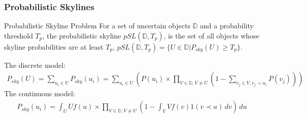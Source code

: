 \documentclass{beamer}
\begin{document}
\begin{frame}
\frametitle{Probabilistic Skylines}
\begin{block}{Probabilistic Skyline Problem}
For a set of uncertain objects $\mathbb{D}$ and a probability threshold $T_p$, the probabilistic skyline $pSL(\mathbb{D}, T_p)$, is the set of all objects whose skyline probabilities are at least $T_p$, $pSL(\mathbb{D}, T_p) = \{U \in \mathbb{D} | P_{sky}(U) \geq T_p\}$.
\end{block}
The discrete model:
\begin{align*}
P_{sky}(U) = \sum\limits_{u_i\in U} P_{sky}(u_i)= \sum\limits_{u_i\in U} (P(u_i)\times\prod\limits_{V\in\mathbb{D},V\neq U}(1-\sum\limits_{v_j\in V,v_j\prec u_i}P(v_j)))
\end{align*}
The continuous model:
\begin{align*}
P_{sky}(u_i) = \int_{U}Uf(u)\times\prod\limits_{V\in\mathbb{D},V\neq U}(1-\int_{V}Vf(v)1(v\prec u)\,dv)\,du
\end{align*}

\end{frame}
\end{document}
